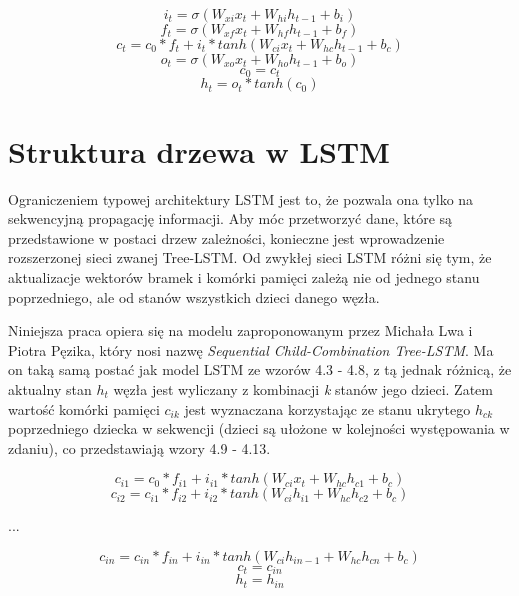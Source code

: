 \begin{equation} i_t = \sigma(W_{xi}x_t + W_{hi}h_{t-1} + b_i) \end{equation}
\begin{equation} f_t = \sigma(W_{xf}x_t + W_{hf}h_{t-1} + b_f) \end{equation}
\begin{equation} c_t = c_0 * f_t + i_t * tanh(W_{ci}x_t + W_{hc}h_{t-1} + b_c)  \end{equation}
\begin{equation} o_t = \sigma(W_{xo}x_t + W_{ho}h_{t-1} + b_o) \end{equation}
\begin{equation} c_0 = c_t \end{equation}
\begin{equation} h_t = o_t * tanh(c_0) \end{equation}

\section{Struktura drzewa w LSTM}
\label{sec:tree}

Ograniczeniem typowej architektury LSTM jest to, że pozwala ona tylko na sekwencyjną propagację informacji. Aby móc przetworzyć dane, które są przedstawione w postaci drzew zależności, konieczne jest wprowadzenie rozszerzonej sieci zwanej Tree-LSTM\cite{tai}. Od zwykłej sieci LSTM różni się tym, że aktualizacje wektorów bramek i komórki pamięci zależą nie od jednego stanu poprzedniego, ale od stanów wszystkich dzieci danego węzła.

Niniejsza praca opiera się na modelu zaproponowanym przez Michała Lwa i Piotra Pęzika\cite{treelstm}, który nosi nazwę \textit{Sequential Child-Combination Tree-LSTM}. Ma on taką samą postać jak model LSTM ze wzorów 4.3 - 4.8, z tą jednak różnicą, że aktualny stan \textit{$h_t$}  węzła jest wyliczany z kombinacji \textit{k} stanów jego dzieci. Zatem wartość komórki pamięci \textit{$c_{ik}$} jest wyznaczana korzystając ze stanu ukrytego \textit{$h_{ck}$} poprzedniego dziecka w sekwencji (dzieci są ułożone w kolejności występowania w zdaniu), co przedstawiają wzory 4.9 - 4.13. 

\begin{equation} c_{i1} = c_0 * f_{i1} + i_{i1} * tanh(W_{ci}x_t + W_{hc}h_{c1} + b_c)  \end{equation}
\begin{equation} c_{i2} = c_{i1} * f_{i2} + i_{i2} * tanh(W_{ci}h_{i1} + W_{hc}h_{c2} + b_c)  \end{equation}
\centerline {...}
\begin{equation} c_{in} = c_{in} * f_{in} + i_{in} * tanh(W_{ci}h_{in-1} + W_{hc}h_{cn} + b_c)  \end{equation}
\begin{equation} c_t = c_{in}  \end{equation}
\begin{equation} h_t = h_{in}  \end{equation}

